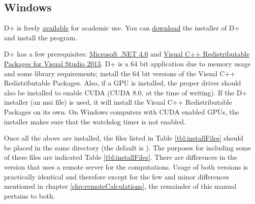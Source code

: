 \documentclass[../D+Manual.tex]{subfiles}
\begin{document}
\subsection{Windows} \label{sec:windowsInstall}


D+ is freely \href{https://scholars.huji.ac.il/uriraviv/book/d-0}{available} for academic use. You can \href{https://drive.google.com/file/d/1Nu7EhBsu0Hwu3VFXv8IoQmhSRk9u5hJs/view?usp=sharing}{download} the installer of D+ and install the program. 

D+ has a few prerequisites: \href{http://www.microsoft.com/en-us/download/details.aspx?id=17718}{Microsoft .NET 4.0} and \href{http://www.microsoft.com/en-us/download/details.aspx?id=40784}{Visual C++ Redistributable Packages for Visual Studio 2013}.
D+ is a 64 bit application due to memory usage and some library requirements; install the 64 bit versions of the Visual C++ Redistributable Packages.
Also, if a GPU is installed, the proper driver should also be installed to enable CUDA (CUDA 8.0, at the time of writing).
If the D+ installer (an msi file) is used, it will install the Visual C++ Redistributable Packages on its own. On Windows computers with CUDA enabled GPUs, the installer makes sure that the watchdog timer is not enabled. 

Once all the above are installed, the files listed in Table \ref{tbl:installFiles} should be placed in the same directory (the default is ).
The purposes for including some of these files are indicated Table \ref{tbl:installFiles}.
There are differences in the version that uses a remote server for the computations.
Usage of both versions is practically identical and therefore except for the few and minor differences mentioned in chapter \ref{chp:remoteCalculations}, the remainder of this manual pertains to both.
\end{document}
